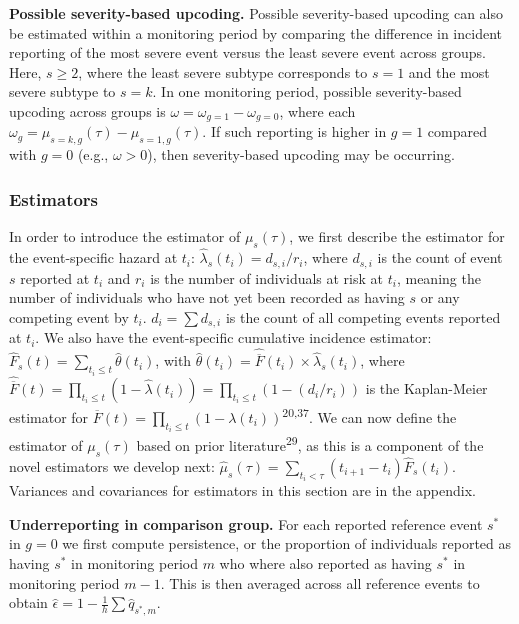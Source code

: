 \documentclass[
  12pt,
  number]{elsarticle}
\begin{document}
\textbf{Possible severity-based upcoding.} Possible severity-based
upcoding can also be estimated within a monitoring period by comparing
the difference in incident reporting of the most severe event versus the
least severe event across groups. Here, \(s \ge 2\), where the least
severe subtype corresponds to \(s = 1\) and the most severe subtype to
\(s = k\). In one monitoring period, possible severity-based upcoding
across groups is \(\omega = \omega_{g=1} - \omega_{g=0}\), where each
\(\omega_{g} = \mu_{s=k,g}(\tau) - \mu_{s=1,g}(\tau)\). If such
reporting is higher in \(g=1\) compared with \(g=0\) (e.g.,
\(\omega > 0\)), then severity-based upcoding may be occurring.

\subsubsection{Estimators}\label{estimators}

In order to introduce the estimator of \(\mu_s(\tau)\), we first
describe the estimator for the event-specific hazard at \(t_i\):
\(\hat{\lambda}_s(t_i) = d_{s,i}/r_i\), where \(d_{s,i}\) is the count
of event \(s\) reported at \(t_i\) and \(r_i\) is the number of
individuals at risk at \(t_i\), meaning the number of individuals who
have not yet been recorded as having \(s\) or any competing event by
\(t_i\). \(d_i = \sum d_{s,i}\) is the count of all competing events
reported at \(t_i\). We also have the event-specific cumulative
incidence estimator:
\(\hat{F}_s(t) = \sum_{t_i \le t} \hat{\theta}(t_i)\), with
\(\hat{\theta}(t_i) = \widehat{\overline{F}}(t_i) \times \hat{\lambda}_s(t_i)\),
where
\(\widehat{\overline{F}}(t) = \prod_{t_i \le t}(1 - \hat{\lambda}(t_i)) = \prod_{t_i \le t}(1 - (d_i/r_i))\)
is the Kaplan-Meier estimator for
\(\overline{F}(t) = \prod_{t_i \le t}(1 - \lambda(t_i))\)\textsuperscript{20,37}.
We can now define the estimator of \(\mu_s(\tau)\) based on prior
literature\textsuperscript{29}, as this is a component of the novel
estimators we develop next:
\(\hat{\mu}_s(\tau) = \sum_{t_i < \tau} (t_{i+1} - t_i)\hat{F}_s(t_i)\).
Variances and covariances for estimators in this section are in the
appendix.

\textbf{Underreporting in comparison group.} For each reported reference
event \(s^*\) in \(g=0\) we first compute persistence, or the proportion
of individuals reported as having \(s^*\) in monitoring period \(m\) who
where also reported as having \(s^*\) in monitoring period \(m-1\). This
is then averaged across all reference events to obtain
\(\hat{\epsilon} = 1 - \frac{1}{h} \sum \hat{q}_{s^*,m}\).
\end{document}
